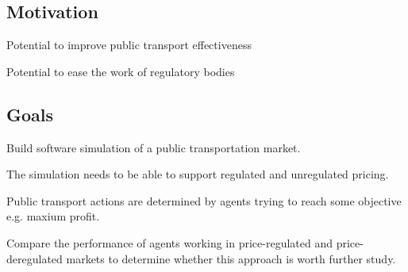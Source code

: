 \subsection{Motivation}

Potential to improve public transport effectiveness

Potential to ease the work of regulatory bodies

\subsection{Goals}

Build software simulation of a public transportation market.

The simulation needs to be able to support regulated and unregulated pricing.

Public transport actions are determined by agents trying to reach some objective
e.g. maxium profit.

Compare the performance of agents working in price-regulated and price-
deregulated markets to determine whether this approach is worth further study.
